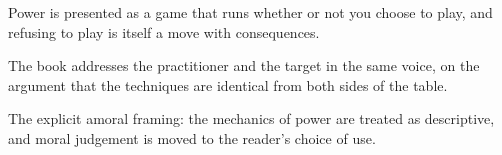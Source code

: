 

\begin{distilled}
  \item Power is presented as a game that runs whether or not you choose to play, and refusing to play is itself a move with consequences.
  \item The book addresses the practitioner and the target in the same voice, on the argument that the techniques are identical from both sides of the table.
\end{distilled}

\begin{unique}
  \item The explicit amoral framing: the mechanics of power are treated as descriptive, and moral judgement is moved to the reader's choice of use.
\end{unique}
